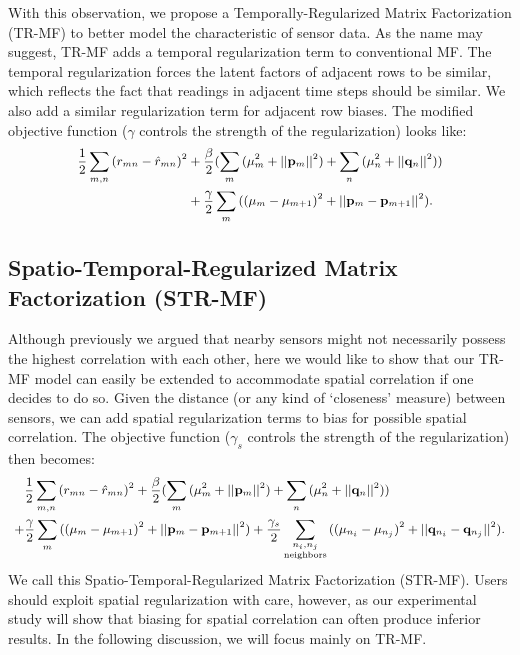 With this observation, we propose a Temporally-Regularized Matrix Factorization (TR-MF) to better model the characteristic of sensor data. As the name may suggest, TR-MF adds a temporal regularization term to conventional MF. 
The temporal regularization forces the latent factors of adjacent rows to be similar, which reflects the fact that 
readings in adjacent time steps should be similar. We also add a similar regularization term for 
adjacent row biases.
The modified objective function ($\gamma$ controls the strength of the regularization) looks like: 
\begin{equation*}\small \begin{aligned}
\frac{1}{2}\sum_{m,n}{(r_{mn} - \hat{r}_{mn})}^2
&+ \frac{\beta}{2}(\sum_m{(\mu_m^2 + ||\mathbf{p}_m||^2)} + \sum_n{(\mu_n^2 + ||\mathbf{q}_n||^2)}) \\
&+ \frac{\gamma}{2} \sum_m{((\mu_m-\mu_{m+1})^2 + ||\mathbf{p}_m-\mathbf{p}_{m+1}||^2)}.
\end{aligned}\end{equation*}

\subsection{Spatio-Temporal-Regularized Matrix Factorization (STR-MF)}

Although previously we argued that nearby sensors might not necessarily possess the highest correlation with each other, 
here we would like to show that our TR-MF model can easily be extended to accommodate spatial correlation if one decides to do so. 
Given the distance (or any kind of `closeness' measure) between sensors, we can add spatial regularization terms to bias for 
possible spatial correlation.
The objective function ($\gamma_s$ controls the strength of the regularization) then becomes: 
\begin{equation*}\small \begin{aligned}
&\frac{1}{2}\sum_{m,n}{(r_{mn} - \hat{r}_{mn})}^2
+\frac{\beta}{2}(\sum_m{(\mu_m^2 + ||\mathbf{p}_m||^2)} + \sum_n{(\mu_n^2 + ||\mathbf{q}_n||^2)}) \\
+&\frac{\gamma}{2} \sum_m{((\mu_m-\mu_{m+1})^2 + ||\mathbf{p}_m-\mathbf{p}_{m+1}||^2)}
+\frac{\gamma_s}{2} \sum\limits_{\substack{n_i, n_j \\ \text{neighbors}}}{((\mu_{n_i}-\mu_{n_j})^2 + ||\mathbf{q}_{n_i}-\mathbf{q}_{n_j}||^2)}.
\end{aligned}\end{equation*}
We call this Spatio-Temporal-Regularized Matrix Factorization (STR-MF). 
Users should exploit spatial regularization with care, however, as our experimental study will show 
that biasing for spatial correlation can often produce inferior results. 
In the following discussion, we will focus mainly on TR-MF.

